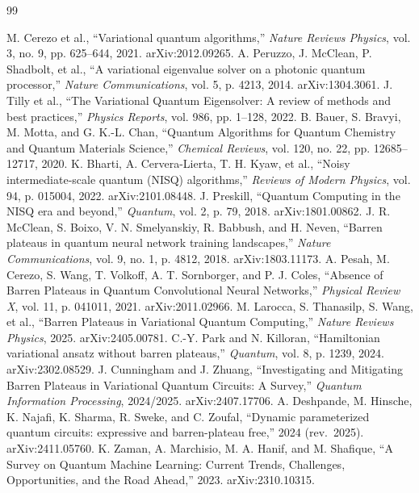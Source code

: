 \documentclass[11pt]{article}
\begin{document}

\begin{thebibliography}{99}

 M. Cerezo et al., ``Variational quantum algorithms,'' \textit{Nature Reviews Physics}, vol. 3, no. 9, pp. 625--644, 2021. arXiv:2012.09265.
 A. Peruzzo, J. McClean, P. Shadbolt, et al., ``A variational eigenvalue solver on a photonic quantum processor,'' \textit{Nature Communications}, vol. 5, p. 4213, 2014. arXiv:1304.3061.
 J. Tilly et al., ``The Variational Quantum Eigensolver: A review of methods and best practices,'' \textit{Physics Reports}, vol. 986, pp. 1--128, 2022.
 B. Bauer, S. Bravyi, M. Motta, and G. K.-L. Chan, ``Quantum Algorithms for Quantum Chemistry and Quantum Materials Science,'' \textit{Chemical Reviews}, vol. 120, no. 22, pp. 12685--12717, 2020.
 K. Bharti, A. Cervera-Lierta, T. H. Kyaw, et al., ``Noisy intermediate-scale quantum (NISQ) algorithms,'' \textit{Reviews of Modern Physics}, vol. 94, p. 015004, 2022. arXiv:2101.08448.
 J. Preskill, ``Quantum Computing in the NISQ era and beyond,'' \textit{Quantum}, vol. 2, p. 79, 2018. arXiv:1801.00862.
 J. R. McClean, S. Boixo, V. N. Smelyanskiy, R. Babbush, and H. Neven, ``Barren plateaus in quantum neural network training landscapes,'' \textit{Nature Communications}, vol. 9, no. 1, p. 4812, 2018. arXiv:1803.11173.
 A. Pesah, M. Cerezo, S. Wang, T. Volkoff, A. T. Sornborger, and P. J. Coles, ``Absence of Barren Plateaus in Quantum Convolutional Neural Networks,'' \textit{Physical Review X}, vol. 11, p. 041011, 2021. arXiv:2011.02966.
 M. Larocca, S. Thanasilp, S. Wang, et al., ``Barren Plateaus in Variational Quantum Computing,'' \textit{Nature Reviews Physics}, 2025. arXiv:2405.00781.
 C.-Y. Park and N. Killoran, ``Hamiltonian variational ansatz without barren plateaus,'' \textit{Quantum}, vol. 8, p. 1239, 2024. arXiv:2302.08529.
 J. Cunningham and J. Zhuang, ``Investigating and Mitigating Barren Plateaus in Variational Quantum Circuits: A Survey,'' \textit{Quantum Information Processing}, 2024/2025. arXiv:2407.17706.
 A. Deshpande, M. Hinsche, K. Najafi, K. Sharma, R. Sweke, and C. Zoufal, ``Dynamic parameterized quantum circuits: expressive and barren-plateau free,'' 2024 (rev.\ 2025). arXiv:2411.05760.
 K. Zaman, A. Marchisio, M. A. Hanif, and M. Shafique, ``A Survey on Quantum Machine Learning: Current Trends, Challenges, Opportunities, and the Road Ahead,'' 2023. arXiv:2310.10315.

\end{thebibliography}
\end{document}
